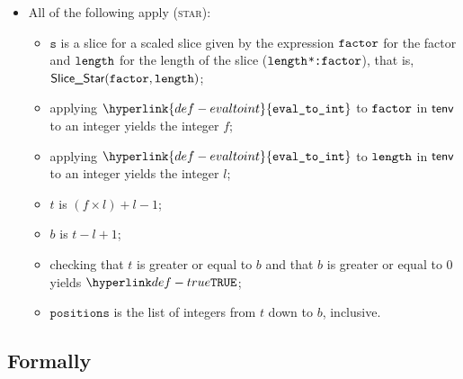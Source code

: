 \documentclass{book}
\newcommand\ProseOrTypeError[0]{\ProseTerminateAs{\TypeErrorConfig}}
\newcommand\evaltoint[0]{\hyperlink{def-evaltoint}{\texttt{eval\_to\_int}}}
\newcommand\vs[0]{\texttt{s}}
\newcommand\positions[0]{\texttt{positions}}
\begin{document}
\begin{itemize}
  \item All of the following apply (\textsc{star}):
  \begin{itemize}
    \item $\vs$ is a slice for a scaled slice given by the expression $\texttt{factor}$
          for the factor and $\texttt{length}$ for the length of the slice (\texttt{$\texttt{length}$*:$\texttt{factor}$}),
          that is, \\ $\textsf{Slice\_Star}(\texttt{factor}, \texttt{length})$;
    \item applying $\evaltoint$ to $\texttt{factor}$ in $\textsf{tenv}$ to an integer yields the integer $f$\ProseOrTypeError;
    \item applying $\evaltoint$ to $\texttt{length}$ in $\textsf{tenv}$ to an integer yields the integer $l$\ProseOrTypeError;
    \item $t$ is $(f \times l) + l - 1$;
    \item $b$ is $t - l + 1$;
    \item checking that $t$ is greater or equal to $b$ and that $b$ is greater or equal to $0$ yields $\True$\ProseOrTypeError;
    \item $\positions$ is the list of integers from $t$ down to $b$, inclusive.
  \end{itemize}
\end{itemize}

\subsection{Formally}
\end{document}
